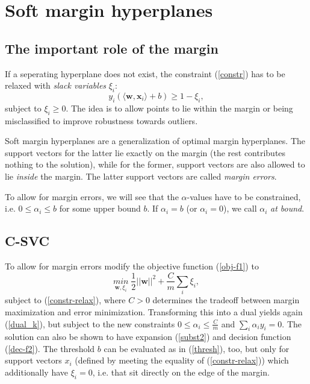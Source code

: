\documentclass[a4paper,10pt]{article}
\begin{document}
\section{Soft margin hyperplanes}
\subsection{The important role of the margin}
If a seperating hyperplane does not exist, the constraint (\ref{constr}) has to be relaxed with \textit{slack variables} $\xi_i$:
\begin{equation}
 \label{constr-relax}
y_i(\langle \mathbf{w},\mathbf{x}_i\rangle +b) \ge 1-\xi_i,
\end{equation} 
subject to $\xi_i\ge 0$. The idea is to allow points to lie within the margin or being misclassified to improve robustness towards outliers.

Soft margin hyperplanes are a generalization of optimal margin hyperplanes. The support vectors for the latter lie exactly on the margin (the rest contributes nothing to the solution), while for the former, support vectors are also allowed to lie \textit{inside} the margin. The latter support vectors are called \textit{margin errors}.

To allow for margin errors, we will see that the $\alpha$-values have to be constrained, i.e. $0\le\alpha_i\le b$ for some upper bound $b$. If $\alpha_i=b$ (or $\alpha_i=0$), we call $\alpha_i$ \textit{at bound}.


\subsection{C-SVC}
To allow for margin errors modify the objective function (\ref{obj-f1}) to
\begin{equation}
 \label{obj-f2}
 \underset{\mathbf{w},\xi_i}{min} \;\frac{1}{2}||\mathbf{w}||^2 + \frac{C}{m} \sum_i \xi_i,
\end{equation} 
subject to (\ref{constr-relax}),
where $C>0$ determines the tradeoff between margin maximization and error minimization. Transforming this into a dual yields again (\ref{dual_k}), but subject to the new constraints $0\le \alpha_i\le \frac{C}{m}$ and $\sum_i \alpha_i y_i = 0$. The solution can also be shown to have expansion (\ref{subst2}) and decision function (\ref{dec-f2}). The threshold $b$ can be evaluated as in (\ref{thresh}), too, but only for support vectors $x_i$ (defined by meeting the equality of (\ref{constr-relax})) which additionally have $\xi_i=0$, i.e. that sit directly on the edge of the margin.
\end{document}
